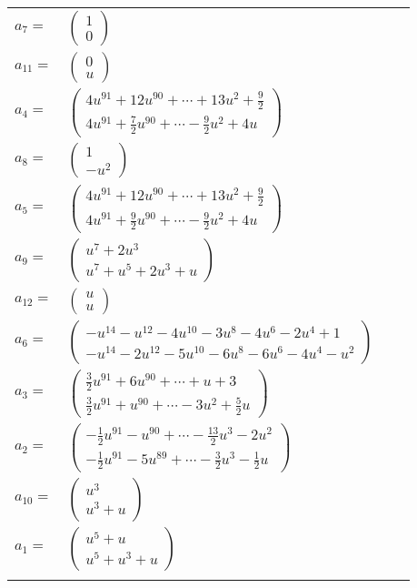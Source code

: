\documentclass[1p]{elsarticle_modified}
\theoremstyle{definition}
\begin{document}
\begin{tabular}{m{7pt} m{180pt} m{7pt} m{180pt} }
\flushright $a_{7}=$&$\begin{pmatrix}1\\0\end{pmatrix}$ \\
\flushright $a_{11}=$&$\begin{pmatrix}0\\u\end{pmatrix}$ \\
\flushright $a_{4}=$&$\begin{pmatrix}4 u^{91}+12 u^{90}+\cdots+13 u^2+\frac{9}{2}\\4 u^{91}+\frac{7}{2} u^{90}+\cdots-\frac{9}{2} u^2+4 u\end{pmatrix}$ \\
\flushright $a_{8}=$&$\begin{pmatrix}1\\- u^2\end{pmatrix}$ \\
\flushright $a_{5}=$&$\begin{pmatrix}4 u^{91}+12 u^{90}+\cdots+13 u^2+\frac{9}{2}\\4 u^{91}+\frac{9}{2} u^{90}+\cdots-\frac{9}{2} u^2+4 u\end{pmatrix}$ \\
\flushright $a_{9}=$&$\begin{pmatrix}u^7+2 u^3\\u^7+u^5+2 u^3+u\end{pmatrix}$ \\
\flushright $a_{12}=$&$\begin{pmatrix}u\\u\end{pmatrix}$ \\
\flushright $a_{6}=$&$\begin{pmatrix}- u^{14}- u^{12}-4 u^{10}-3 u^8-4 u^6-2 u^4+1\\- u^{14}-2 u^{12}-5 u^{10}-6 u^8-6 u^6-4 u^4- u^2\end{pmatrix}$ \\
\flushright $a_{3}=$&$\begin{pmatrix}\frac{3}{2} u^{91}+6 u^{90}+\cdots+u+3\\\frac{3}{2} u^{91}+u^{90}+\cdots-3 u^2+\frac{5}{2} u\end{pmatrix}$ \\
\flushright $a_{2}=$&$\begin{pmatrix}-\frac{1}{2} u^{91}- u^{90}+\cdots-\frac{13}{2} u^3-2 u^2\\-\frac{1}{2} u^{91}-5 u^{89}+\cdots-\frac{3}{2} u^3-\frac{1}{2} u\end{pmatrix}$ \\
\flushright $a_{10}=$&$\begin{pmatrix}u^3\\u^3+u\end{pmatrix}$ \\
\flushright $a_{1}=$&$\begin{pmatrix}u^5+u\\u^5+u^3+u\end{pmatrix}$\\&\end{tabular}
\end{document}
